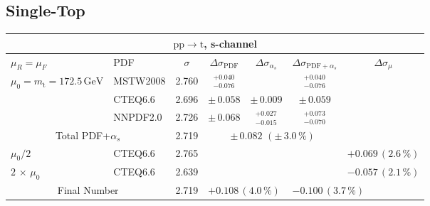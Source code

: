 \subsection*{Single-Top}

\begin{table}[htb]
  \begin{center}
    \begin{tabular}{|l|l|c|c|c|c|c|}
      \hline

      \multicolumn{7}{|c|}{$\mathrm{pp}\to\mathrm{t}$, s-channel} \\ \hline
      $\mu_R=\mu_F$ & PDF & $\sigma$ & $\Delta\sigma_{\mathrm{PDF}}$ & $\Delta\sigma_{\alpha_s}$ & $\Delta\sigma_{\mathrm{PDF}+\alpha_s}$ & $\Delta\sigma_{\mu}$ \\ \hline\hline

      $\mu_0=m_\mathrm{t}=172.5\,\mathrm{GeV}$ & MSTW2008 & 2.760 & $^{+0.040}_{-0.076}$ &     &  $^{+0.040}_{-0.076}$    &     \\
                                                & CTEQ6.6  & 2.696 & $\pm\,0.058$ &  $\pm\,0.009$  &  $\pm\,0.059$       &     \\
                                                & NNPDF2.0 & 2.726 & $\pm\,0.068$ &  $^{+0.027}_{-0.015}$  & $^{+0.073}_{-0.070}$     &     \\ \hline\hline
      \multicolumn{2}{|c|}{Total PDF+$\alpha_s$}      &  2.719    & \multicolumn{3}{c|}{$\pm\,0.082\,\,(\pm\,3.0\,\%)$} & \\ \hline\hline
      $\mu_0/2$                                 & CTEQ6.6 & 2.765 & \multicolumn{3}{c|}{} & $+0.069\,(2.6\,\%)$ \\ 
      $2\,\times\,\mu_0$                        & CTEQ6.6 & 2.639 & \multicolumn{3}{c|}{} & $-0.057\,(2.1\,\%)$ \\  \hline\hline
      \multicolumn{2}{|c|}{Final Number} & 2.719  & \multicolumn{2}{l}{$+0.108\,(4.0\,\%)$} & \multicolumn{2}{l|}{$-0.100\,(3.7\,\%)$} \\


\hline 
\end{tabular}
\end{center}
\end{table} 


